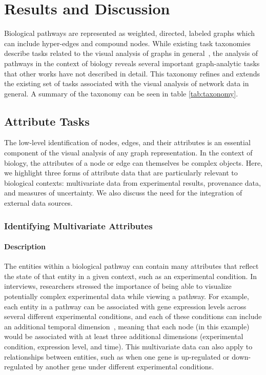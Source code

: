 \documentclass[twocolumn]{bmcart}%
\begin{document}
\section*{Results and Discussion}

Biological pathways are represented as weighted, directed, labeled graphs which can include hyper-edges and compound nodes.
While existing task taxonomies describe tasks related to the visual analysis of graphs in general~\cite{Ahn2014, Pretorius2014}, the analysis of pathways in the context of biology reveals several important graph-analytic tasks that other works have not described in detail.
This taxonomy refines and extends the existing set of tasks associated with the visual analysis of network data in general.
A summary of the taxonomy can be seen in table \ref{tab:taxonomy}.

\subsection*{Attribute Tasks}

The low-level identification of nodes, edges, and their attributes is an essential component of the visual analysis of any graph representation.
In the context of biology, the attributes of a node or edge can themselves be complex objects.
Here, we highlight three forms of attribute data that are particularly relevant to biological contexts: multivariate data from experimental results, provenance data, and measures of uncertainty.
We also discuss the need for the integration of external data sources.

\subsubsection*{Identifying Multivariate Attributes}

\paragraph*{Description}

The entities within a biological pathway can contain many attributes that reflect the state of that entity in a given context, such as an experimental condition.
In interviews, researchers stressed the importance of being able to visualize potentially complex experimental data while viewing a pathway.
For example, each entity in a pathway can be associated with gene expression levels across several different experimental conditions, and each of these conditions can include an additional temporal dimension~\cite{Barsky2008cerebral}, meaning that each node (in this example) would be associated with at least three additional dimensions (experimental condition, expression level, and time).
This multivariate data can also apply to relationships between entities, such as when one gene is up-regulated or down-regulated by another gene under different experimental conditions.
\end{document}

